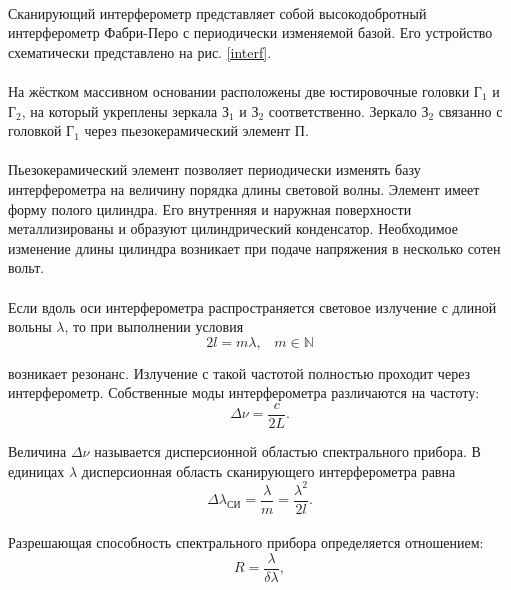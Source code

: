 \documentclass[a4paper,12pt]{article} %
\begin{document}
\paragraph{} Сканирующий интерферометр представляет собой высокодобротный интерферометр Фабри-Перо с периодически изменяемой базой. Его устройство схематически представлено на рис. \ref{interf}. 
\paragraph{} На жёстком массивном основании расположены две юстировочные головки Г$_1$  и Г$_2$, на который укреплены зеркала З$_1$ и З$_2$ соответственно. Зеркало З$_2$ связанно с головкой Г$_1$ через пьезокерамический элемент П.
\paragraph{} Пьезокерамический элемент позволяет периодически изменять базу интерферометра на величину порядка длины световой волны. Элемент имеет форму полого цилиндра. Его внутренняя и наружная поверхности металлизированы и образуют цилиндрический конденсатор. Необходимое изменение длины цилиндра возникает при подаче напряжения в несколько сотен вольт.
\paragraph{} Если вдоль оси интерферометра распространяется световое излучение с длиной вольны $\lambda$, то при выполнении условия
\begin{equation}
2l = m\lambda, \;\;\; m \in \mathbb{N}
\label{e:inter}
\end{equation}

\noindent возникает резонанс. Излучение с такой частотой полностью проходит через интерферометр. Собственные моды интерферометра различаются на частоту:
\[ \Delta \nu = \frac{c}{2L}.
\]

\noindent Величина $\Delta \nu$ называется дисперсионной областью спектрального прибора. В единицах $\lambda$ дисперсионная область сканирующего интерферометра равна
\begin{equation}
\Delta \lambda_\text{СИ} = \frac{\lambda}{m} = \frac{\lambda^2}{2l}.
\label{e:area}
\end{equation}

\paragraph{} Разрешающая способность спектрального прибора определяется отношением:
\begin{equation}
R = \frac{\lambda}{\delta \lambda},
\label{e:res}
\end{equation}
\end{document}
